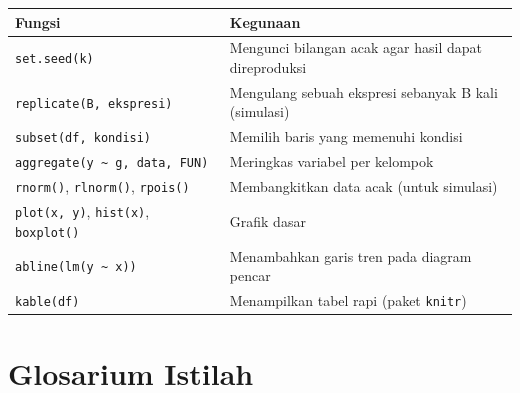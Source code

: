 \documentclass[
  indonesian,
  letterpaper,
]{book}
\newcounter{none} %
\begin{document}
{\def\LTcaptype{none} %
\begin{longtable}[]{@{}
  >{\raggedright\arraybackslash}p{}
  >{\raggedright\arraybackslash}p{}@{}}
\toprule\noalign{}
\begin{minipage}[b]{\linewidth}\raggedright
Fungsi
\end{minipage} & \begin{minipage}[b]{\linewidth}\raggedright
Kegunaan
\end{minipage} \\
\midrule\noalign{}
\endhead
\bottomrule\noalign{}
\endlastfoot
\texttt{set.seed(k)} & Mengunci bilangan acak agar hasil dapat
direproduksi \\
\texttt{replicate(B,\ ekspresi)} & Mengulang sebuah ekspresi sebanyak B
kali (simulasi) \\
\texttt{subset(df,\ kondisi)} & Memilih baris yang memenuhi kondisi \\
\texttt{aggregate(y\ \textasciitilde{}\ g,\ data,\ FUN)} & Meringkas
variabel per kelompok \\
\texttt{rnorm()}, \texttt{rlnorm()}, \texttt{rpois()} & Membangkitkan
data acak (untuk simulasi) \\
\texttt{plot(x,\ y)}, \texttt{hist(x)}, \texttt{boxplot()} & Grafik
dasar \\
\texttt{abline(lm(y\ \textasciitilde{}\ x))} & Menambahkan garis tren
pada diagram pencar \\
\texttt{kable(df)} & Menampilkan tabel rapi (paket \texttt{knitr}) \\
\end{longtable}
}

\section{Glosarium Istilah}\label{glosarium-istilah}
\end{document}
